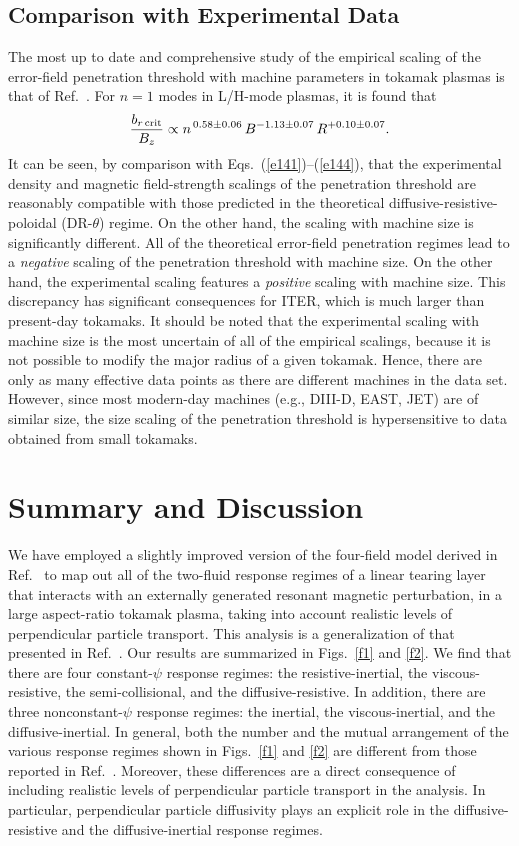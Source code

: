 \documentclass[12pt,prb,aps]{revtex4-1}
\begin{document}
\subsection{Comparison with Experimental Data}
The most up to date and comprehensive study of the empirical scaling of the error-field penetration threshold
with machine parameters in tokamak plasmas is that of Ref.~. For $n=1$ modes in L/H-mode plasmas,
it is found that
\begin{equation}
\frac{b_{r\,{\rm crit}}}{B_z}\propto n^{\,0.58\pm 0.06}\,B^{-1.13\pm 0.07}\,R^{+0.10\pm0.07}.
\end{equation}
It can be seen, by comparison with Eqs.~(\ref{e141})--(\ref{e144}), that the experimental density and magnetic field-strength scalings of the penetration threshold are reasonably compatible with those predicted in the theoretical diffusive-resistive-poloidal (DR-$\theta$) regime. On the other hand, the scaling with machine size is significantly different. All of the theoretical
error-field penetration regimes lead to a {\em negative}\/ scaling of the penetration threshold with machine size.
On the other hand, the experimental scaling features a {\em positive}\/ scaling with machine size. This discrepancy has
significant consequences for ITER, which is much larger than present-day tokamaks. It should
be noted that the experimental scaling with machine size is the most uncertain of all of the empirical scalings, because it is
not possible to modify the major radius of a given tokamak. Hence, there are only as many effective data
points as there are different machines in the data set. However, since most modern-day machines (e.g., DIII-D, EAST, JET) are of similar size, the size scaling of the penetration threshold is hypersensitive to data obtained from small
tokamaks. 

\section{Summary and Discussion}
We have employed a slightly improved version of the four-field model derived in Ref.~ to map out  all of the
two-fluid response regimes of a  linear tearing layer that interacts with an externally generated resonant magnetic perturbation,  in a large aspect-ratio tokamak plasma, 
taking into account realistic levels of perpendicular particle transport. This analysis is a generalization of that
presented in Ref.~. Our results are summarized in Figs.~\ref{f1} and
\ref{f2}. We find that there are four constant-$\psi$ response regimes: the resistive-inertial, the viscous-resistive, the
semi-collisional, and the diffusive-resistive. In addition, there are three nonconstant-$\psi$ response regimes: the inertial, the
viscous-inertial, and the diffusive-inertial. In general, both the number and the mutual arrangement of the various response regimes shown
in Figs.~\ref{f1} and \ref{f2} are different from those reported in Ref.~. Moreover, these differences are a direct 
consequence of including realistic levels of perpendicular particle transport in the analysis. In particular, perpendicular particle
diffusivity plays an explicit role in the diffusive-resistive and the diffusive-inertial response regimes. 
\end{document}
